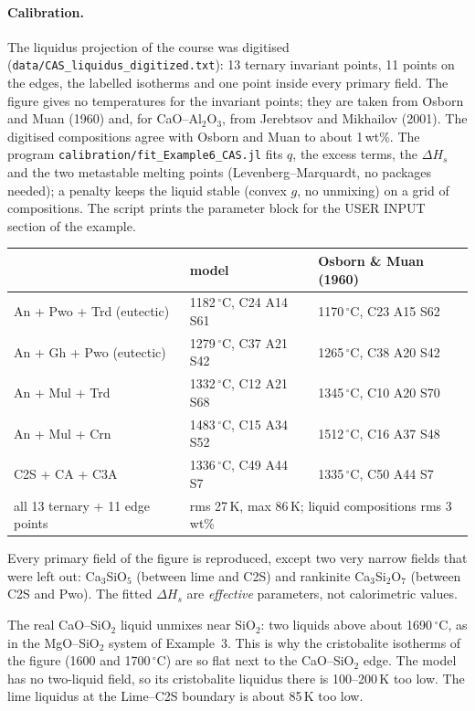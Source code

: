 \documentclass[11pt,a4paper]{article}
\newcommand{\file}[1]{\texttt{#1}}
\begin{document}
\paragraph{Calibration.} {\sloppy The liquidus projection of the course was digitised
(\file{data/\allowbreak CAS\_liquidus\_\allowbreak digitized.txt}): 13 ternary invariant points, 11 points on
the edges, the labelled isotherms and one point inside every primary field. The figure gives no temperatures
for the invariant points; they are taken from Osborn and Muan (1960) and, for CaO–Al$_2$O$_3$, from Jerebtsov
and Mikhailov (2001). The digitised compositions agree with Osborn and Muan to about 1\,wt\%. The program
\file{calibration/\allowbreak fit\_Example6\_CAS.jl} fits $q$, the excess terms, the $\Delta H_s$ and the two
metastable melting points (Levenberg–Marquardt, no packages needed); a penalty keeps the liquid stable
(convex $g$, no unmixing) on a grid of compositions. The script prints the parameter block for the USER INPUT
section of the example.\par}
\begin{table}[H]
\centering\small
\begin{tabular}{@{}lll@{}}
\toprule
 & model & Osborn \& Muan (1960) \\ \midrule
An + Pwo + Trd (eutectic) & 1182\,$^\circ$C, C24 A14 S61 & 1170\,$^\circ$C, C23 A15 S62 \\
An + Gh + Pwo (eutectic)  & 1279\,$^\circ$C, C37 A21 S42 & 1265\,$^\circ$C, C38 A20 S42 \\
An + Mul + Trd            & 1332\,$^\circ$C, C12 A21 S68 & 1345\,$^\circ$C, C10 A20 S70 \\
An + Mul + Crn            & 1483\,$^\circ$C, C15 A34 S52 & 1512\,$^\circ$C, C16 A37 S48 \\
C2S + CA + C3A            & 1336\,$^\circ$C, C49 A44 S7  & 1335\,$^\circ$C, C50 A44 S7 \\
\midrule
all 13 ternary + 11 edge points & \multicolumn{2}{l}{rms 27\,K, max 86\,K; liquid compositions rms 3\,wt\%} \\
\bottomrule
\end{tabular}
\end{table}
\noindent Every primary field of the figure is reproduced, except two very narrow fields that were left
out: Ca$_3$SiO$_5$ (between lime and C2S) and rankinite Ca$_3$Si$_2$O$_7$ (between C2S and Pwo). The fitted
$\Delta H_s$ are \emph{effective} parameters, not calorimetric values.

\begin{note}
The real CaO–SiO$_2$ liquid unmixes near SiO$_2$: two liquids above about 1690\,$^\circ$C, as in the
MgO–SiO$_2$ system of Example~3. This is why the cristobalite isotherms of the figure (1600 and 1700\,$^\circ$C)
are so flat next to the CaO–SiO$_2$ edge. The model has no two-liquid field, so its cristobalite liquidus
there is 100–200\,K too low. The lime liquidus at the Lime–C2S boundary is about 85\,K too low.
\end{note}
\end{document}
